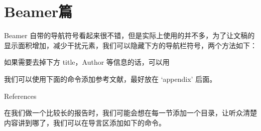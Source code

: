 %
%
%
%

\section{Beamer篇}



Beamer
自带的导航符号看起来很不错，但是实际上使用的并不多，为了让文稿的显示面积增加，减少干扰元素，我们可以隐藏下方的导航栏符号，两个方法如下：

\begin{texinlist}
\beamertemplatenavigationsymbolsempty %
\end{texinlist}

如果需要去掉下方 title，Author 等信息的话，可以用

\begin{texinlist}
\end{texinlist}



我们可以使用下面的命令添加参考文献，最好放在 `appendix' 后面。

\begin{texinlist}
\begin{frame}[allowframebreaks]{References}
\def\newblock{}


\end{frame}
\end{texinlist}



在我们做一个比较长的报告时，我们可能会想在每一节添加一个目录，让听众清楚内容讲到哪了，我们可以在导言区添加如下的命令。

\begin{texinlist}
\end{texinlist}

